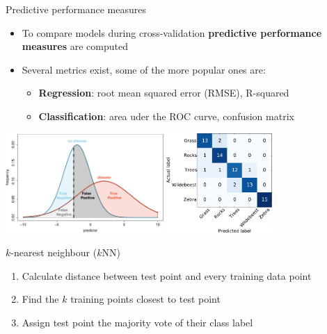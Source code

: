 \documentclass[pdf]{beamer}
\begin{document}
\begin{frame}{Predictive performance measures}

\begin{itemize}\addtolength{\itemsep}{.75\baselineskip}
	\item To compare models during cross-validation \textbf{predictive performance measures} are computed
	\item Several metrics exist, some of the more popular ones are:
	\begin{itemize}
		\item \textbf{Regression}: root mean squared error (RMSE), R-squared
		\item \textbf{Classification}: area uder the ROC curve, confusion matrix
	\end{itemize}
\end{itemize}
\vfill
\centering
\includegraphics[width=0.45\textwidth]{binaryclassifier.pdf}\hspace{1cm}
\includegraphics[width=0.3\textwidth]{confusionmatrix.pdf}

\end{frame}

\begin{frame}{$k$-nearest neighbour ($k$NN)}
\begin{enumerate}\addtolength{\itemsep}{2\baselineskip}
	\item<2-> Calculate distance between test point and every training data point 
	\item<3-> Find the $k$ training points closest to test point 
	\item<4-> Assign test point the majority vote of their class label
\end{enumerate}
\end{frame}
\end{document}
